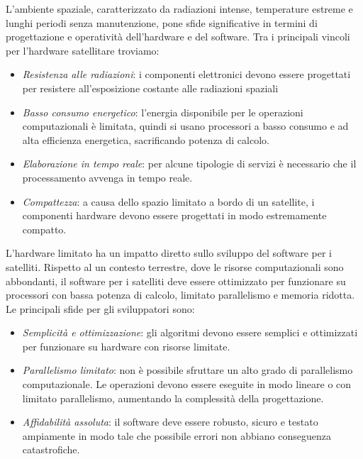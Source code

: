 L'ambiente spaziale, caratterizzato da radiazioni intense, temperature estreme e lunghi periodi senza manutenzione, pone sfide significative in termini di progettazione e operatività dell'hardware e del software.
Tra i principali vincoli per l'hardware satellitare troviamo:

\begin{itemize}
    \item \textit{Resistenza alle radiazioni}: i componenti elettronici devono essere progettati per resistere all'esposizione costante alle radiazioni spaziali
    \item \textit{Basso consumo energetico}: l'energia disponibile per le operazioni\\ computazionali è limitata, quindi si usano processori a basso consumo e ad alta efficienza energetica, sacrificando potenza di calcolo.
    \item \textit{Elaborazione in tempo reale}: per alcune tipologie di servizi è necessario che il processamento avvenga in tempo reale.
    \item \textit{Compattezza}: a causa dello spazio limitato a bordo di un satellite, i componenti hardware devono essere progettati in modo estremamente compatto.
\end{itemize}

\noindent
L'hardware limitato ha un impatto diretto sullo sviluppo del software per i satelliti. 
Rispetto al un contesto terrestre, dove le risorse computazionali sono abbondanti, il software per i satelliti deve essere ottimizzato per funzionare su processori con bassa potenza di calcolo, limitato parallelismo e memoria ridotta. 
Le principali sfide per gli sviluppatori sono:

\begin{itemize}
    \item \textit{Semplicità e ottimizzazione}: gli algoritmi devono essere semplici e ottimizzati per funzionare su hardware con risorse limitate.
    \item \textit{Parallelismo limitato}: non è possibile sfruttare un alto grado di parallelismo computazionale. Le operazioni devono essere eseguite in modo lineare o con limitato parallelismo, aumentando la complessità della progettazione.
    \item \textit{Affidabilità assoluta}: il software deve essere robusto, sicuro e testato ampiamente in modo tale che possibile errori non abbiano conseguenza catastrofiche.
\end{itemize}

